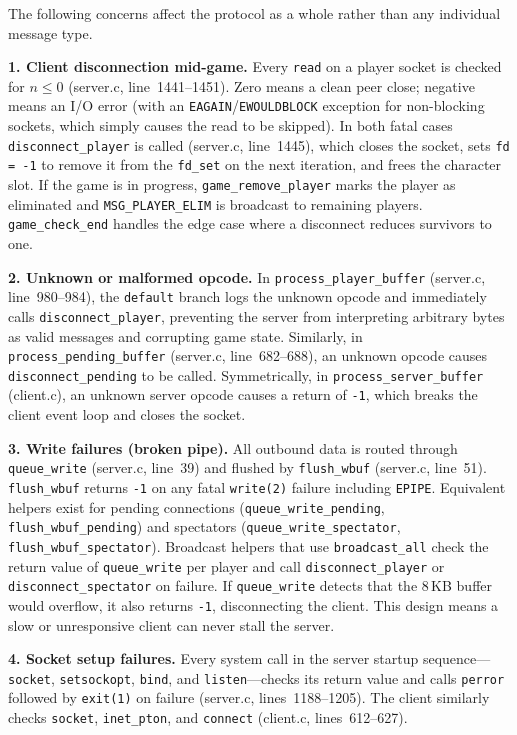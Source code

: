 \documentclass[11pt,letterpaper]{article}
\begin{document}
The following concerns affect the protocol as a whole rather than any individual message type.

\textbf{1. Client disconnection mid-game.} Every \texttt{read} on a player socket is checked for $n \leq 0$ (server.c, line~1441--1451). Zero means a clean peer close; negative means an I/O error (with an \texttt{EAGAIN}/\texttt{EWOULDBLOCK} exception for non-blocking sockets, which simply causes the read to be skipped). In both fatal cases \texttt{disconnect\_player} is called (server.c, line~1445), which closes the socket, sets \texttt{fd = -1} to remove it from the \texttt{fd\_set} on the next iteration, and frees the character slot. If the game is in progress, \texttt{game\_remove\_player} marks the player as eliminated and \texttt{MSG\_PLAYER\_ELIM} is broadcast to remaining players. \texttt{game\_check\_end} handles the edge case where a disconnect reduces survivors to one.

\textbf{2. Unknown or malformed opcode.} In \texttt{process\_player\_buffer} (server.c, line~980--984), the \texttt{default} branch logs the unknown opcode and immediately calls \texttt{disconnect\_player}, preventing the server from interpreting arbitrary bytes as valid messages and corrupting game state. Similarly, in \texttt{process\_pending\_buffer} (server.c, line~682--688), an unknown opcode causes \texttt{disconnect\_pending} to be called. Symmetrically, in \texttt{process\_server\_buffer} (client.c), an unknown server opcode causes a return of \texttt{-1}, which breaks the client event loop and closes the socket.

\textbf{3. Write failures (broken pipe).} All outbound data is routed through \texttt{queue\_write} (server.c, line~39) and flushed by \texttt{flush\_wbuf} (server.c, line~51). \texttt{flush\_wbuf} returns \texttt{-1} on any fatal \texttt{write(2)} failure including \texttt{EPIPE}. Equivalent helpers exist for pending connections (\texttt{queue\_write\_pending}, \texttt{flush\_wbuf\_pending}) and spectators (\texttt{queue\_write\_spectator}, \texttt{flush\_wbuf\_spectator}). Broadcast helpers that use \texttt{broadcast\_all} check the return value of \texttt{queue\_write} per player and call \texttt{disconnect\_player} or \texttt{disconnect\_spectator} on failure. If \texttt{queue\_write} detects that the 8\,KB buffer would overflow, it also returns \texttt{-1}, disconnecting the client. This design means a slow or unresponsive client can never stall the server.

\textbf{4. Socket setup failures.} Every system call in the server startup sequence---\texttt{socket}, \texttt{setsockopt}, \texttt{bind}, and \texttt{listen}---checks its return value and calls \texttt{perror} followed by \texttt{exit(1)} on failure (server.c, lines~1188--1205). The client similarly checks \texttt{socket}, \texttt{inet\_pton}, and \texttt{connect} (client.c, lines~612--627).
\end{document}
